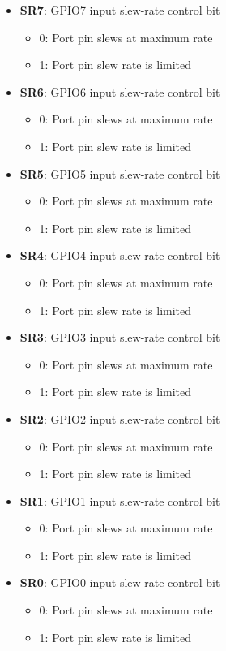 \documentclass{article}
\begin{document}
	\begin{itemize}
		\item \textbf{SR7}: GPIO7 input slew-rate control bit
		\begin{itemize}
			\item 0: Port pin slews at maximum rate
			\item 1: Port pin slew rate is limited
		\end{itemize}
		\item \textbf{SR6}: GPIO6 input slew-rate control bit
		\begin{itemize}
			\item 0: Port pin slews at maximum rate
			\item 1: Port pin slew rate is limited
		\end{itemize}
		\item \textbf{SR5}: GPIO5 input slew-rate control bit
		\begin{itemize}
			\item 0: Port pin slews at maximum rate
			\item 1: Port pin slew rate is limited
		\end{itemize}
		\item \textbf{SR4}: GPIO4 input slew-rate control bit
		\begin{itemize}
			\item 0: Port pin slews at maximum rate
			\item 1: Port pin slew rate is limited
		\end{itemize}
		\item \textbf{SR3}: GPIO3 input slew-rate control bit
		\begin{itemize}
			\item 0: Port pin slews at maximum rate
			\item 1: Port pin slew rate is limited
		\end{itemize}
		\item \textbf{SR2}: GPIO2 input slew-rate control bit
		\begin{itemize}
			\item 0: Port pin slews at maximum rate
			\item 1: Port pin slew rate is limited
		\end{itemize}
		\item \textbf{SR1}: GPIO1 input slew-rate control bit
		\begin{itemize}
			\item 0: Port pin slews at maximum rate
			\item 1: Port pin slew rate is limited
		\end{itemize}
		\item \textbf{SR0}: GPIO0 input slew-rate control bit
		\begin{itemize}
			\item 0: Port pin slews at maximum rate
			\item 1: Port pin slew rate is limited
		\end{itemize}

	\end{itemize}
\end{document}
